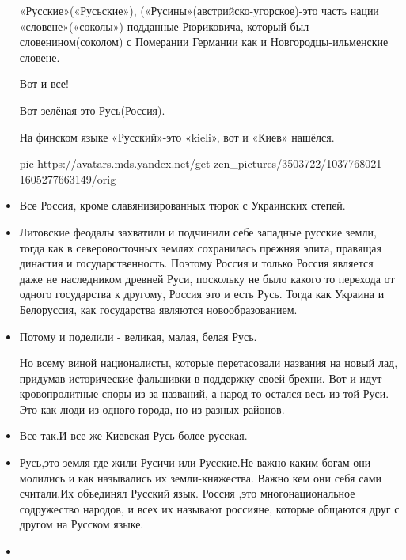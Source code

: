 \begin{itemize}
«Русские»(«Русьские»), («Русины»(австрийско-угорское)-это часть нации
«словене»(«соколы») подданные Рюриковича, который был словенином(соколом) с
Померании Германии как и Новгородцы-ильменские словене.

Вот и все!

Вот зелёная это Русь(Россия).

На финском языке «Русский»-это «kieli», вот и «Киев» нашёлся.

\ifcmt
pic https://avatars.mds.yandex.net/get-zen_pictures/3503722/1037768021-1605277663149/orig
\fi

\item {}

Все Россия, кроме славянизированных тюрок с Украинских степей.

\item {}

Литовские феодалы захватили и подчинили себе западные русские земли, тогда как
в северовосточных землях сохранилась прежняя элита, правящая династия и
государственность. Поэтому Россия и только Россия является даже не наследником
древней Руси, поскольку не было какого то перехода от одного государства к
другому, Россия это и есть Русь. Тогда как Украина и Белоруссия, как
государства являются новообразованием.

\item {}

Потому и поделили - великая, малая, белая Русь.

Но всему виной националисты, которые перетасовали названия на новый лад,
придумав исторические фальшивки в поддержку своей брехни. Вот и идут
кровопролитные споры из-за названий, а народ-то остался весь из той Руси. Это
как люди из одного города, но из разных районов.

\item {}

Все так.И все же Киевская Русь более русская.

\item {}

Русь,это земля где жили Русичи или Русские.Не важно каким богам они молились и
как назывались их земли-княжества. Важно кем они себя сами считали.Их объединял
Русский язык. Россия ,это многонациональное содружество народов, и всех их
называют россияне, которые общаются друг с другом на Русском языке.

\item {}


\end{itemize}
